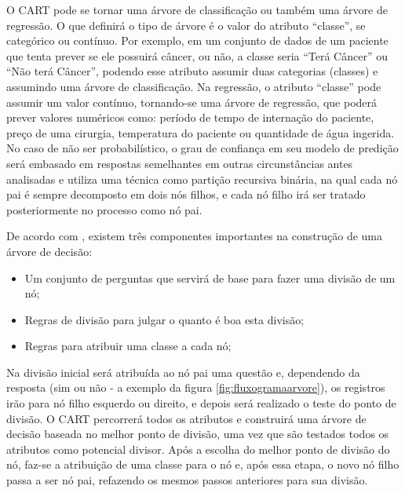 O CART pode se tornar uma árvore de classificação ou também uma árvore de regressão. O que definirá o tipo de árvore é o valor do atributo “classe”, se categórico ou contínuo. Por exemplo, em um conjunto de dados de um paciente que tenta prever se  ele possuirá câncer, ou não, a classe seria ``Terá Câncer'' ou ``Não terá Câncer'', podendo esse atributo assumir duas categorias (classes) e assumindo uma árvore de classificação. Na regressão, o atributo ``classe'' pode assumir um valor contínuo, tornando-se uma árvore de regressão, que poderá prever valores numéricos como: período de tempo de internação do paciente, preço de uma cirurgia, temperatura do paciente ou quantidade de água ingerida. No caso de não ser probabilístico, o grau de confiança em seu modelo de predição será embasado em respostas semelhantes em outras circunstâncias antes analisadas e utiliza uma técnica como partição recursiva binária, na qual cada nó pai é sempre decomposto em dois nós filhos, e cada nó filho irá ser tratado posteriormente no processo como nó pai. 

De acordo com , existem três componentes importantes na construção de uma árvore de decisão:

\begin{itemize}
[noitemsep]
 \item Um conjunto de perguntas que servirá de base para fazer uma divisão de um nó;
 \item Regras de divisão para julgar o quanto é boa esta divisão;
 \item Regras para atribuir uma classe a cada nó;
\end{itemize}

Na divisão inicial será atribuída ao nó pai uma questão e,  dependendo da resposta (sim ou não - a exemplo da figura \ref{fig:fluxogramaarvore}), os registros irão para nó filho esquerdo ou direito, e depois será realizado o teste do ponto de divisão. O CART percorrerá todos os atributos e construirá uma árvore de decisão baseada no melhor ponto de divisão, uma vez que são testados todos os atributos como potencial divisor. Após a escolha do melhor ponto de divisão do nó, faz-se a atribuição de uma classe para o nó e, após essa etapa, o novo nó filho passa a ser nó pai, refazendo os mesmos passos anteriores para sua divisão.

